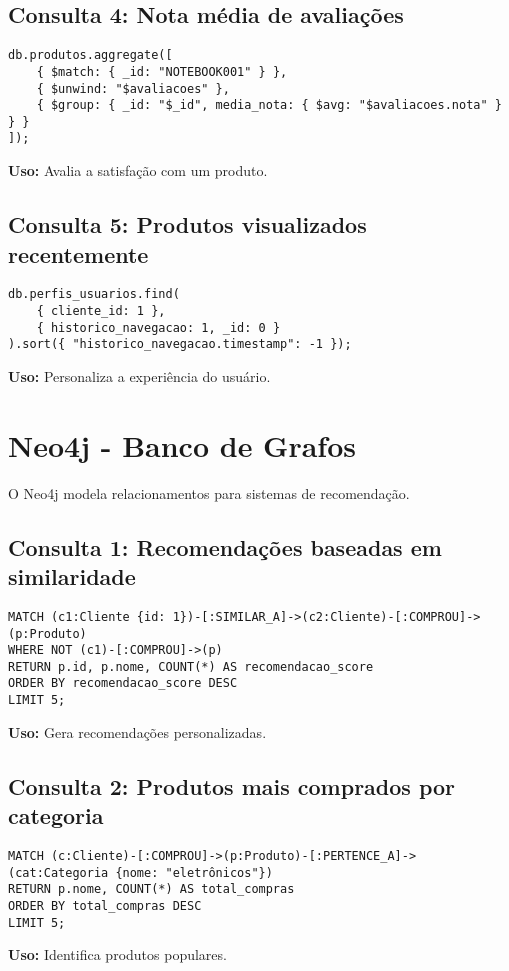 \documentclass[a4paper,12pt]{article}
\begin{document}
\subsection{Consulta 4: Nota média de avaliações}
\begin{lstlisting}[language=MongoDB]
db.produtos.aggregate([
    { $match: { _id: "NOTEBOOK001" } },
    { $unwind: "$avaliacoes" },
    { $group: { _id: "$_id", media_nota: { $avg: "$avaliacoes.nota" } } }
]);
\end{lstlisting}
\textbf{Uso:} Avalia a satisfação com um produto.

\subsection{Consulta 5: Produtos visualizados recentemente}
\begin{lstlisting}[language=MongoDB]
db.perfis_usuarios.find(
    { cliente_id: 1 },
    { historico_navegacao: 1, _id: 0 }
).sort({ "historico_navegacao.timestamp": -1 });
\end{lstlisting}
\textbf{Uso:} Personaliza a experiência do usuário.

\section{Neo4j - Banco de Grafos}
O Neo4j modela relacionamentos para sistemas de recomendação.

\subsection{Consulta 1: Recomendações baseadas em similaridade}
\begin{lstlisting}[language=Cypher]
MATCH (c1:Cliente {id: 1})-[:SIMILAR_A]->(c2:Cliente)-[:COMPROU]->(p:Produto)
WHERE NOT (c1)-[:COMPROU]->(p)
RETURN p.id, p.nome, COUNT(*) AS recomendacao_score
ORDER BY recomendacao_score DESC
LIMIT 5;
\end{lstlisting}
\textbf{Uso:} Gera recomendações personalizadas.

\subsection{Consulta 2: Produtos mais comprados por categoria}
\begin{lstlisting}[language=Cypher]
MATCH (c:Cliente)-[:COMPROU]->(p:Produto)-[:PERTENCE_A]->(cat:Categoria {nome: "eletrônicos"})
RETURN p.nome, COUNT(*) AS total_compras
ORDER BY total_compras DESC
LIMIT 5;
\end{lstlisting}
\textbf{Uso:} Identifica produtos populares.
\end{document}
